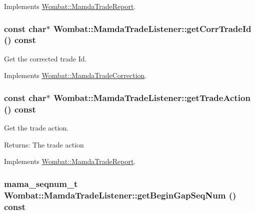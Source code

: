 Implements \hyperlink{classWombat_1_1MamdaTradeReport_8bccbbb68ce93d26fd87db95f2f7ff26}{Wombat::Mamda\-Trade\-Report}.\hypertarget{classWombat_1_1MamdaTradeListener_307d09719f4d878bdaeb211a6aa38465}{
\subsubsection[getCorrTradeId]{\setlength{\rightskip}{0pt plus 5cm}const char$\ast$ Wombat::Mamda\-Trade\-Listener::get\-Corr\-Trade\-Id () const}}
\label{classWombat_1_1MamdaTradeListener_307d09719f4d878bdaeb211a6aa38465}


Get the corrected trade Id. 



Implements \hyperlink{classWombat_1_1MamdaTradeCorrection_9e1763eab254bbe87ff3a577bb7c5ab3}{Wombat::Mamda\-Trade\-Correction}.\hypertarget{classWombat_1_1MamdaTradeListener_9201b4749efd0f17dc42abf5c2bc2060}{
\subsubsection[getTradeAction]{\setlength{\rightskip}{0pt plus 5cm}const char$\ast$ Wombat::Mamda\-Trade\-Listener::get\-Trade\-Action () const}}
\label{classWombat_1_1MamdaTradeListener_9201b4749efd0f17dc42abf5c2bc2060}


Get the trade action. 

\begin{Desc}
\item[Returns:]The trade action \end{Desc}


Implements \hyperlink{classWombat_1_1MamdaTradeReport_488ca9ba3b64fd6c0996e0df649c5834}{Wombat::Mamda\-Trade\-Report}.\hypertarget{classWombat_1_1MamdaTradeListener_62f2fd151a022948527e1f6ed74ced3d}{
\subsubsection[getBeginGapSeqNum]{\setlength{\rightskip}{0pt plus 5cm}mama\_\-seqnum\_\-t Wombat::Mamda\-Trade\-Listener::get\-Begin\-Gap\-Seq\-Num () const}}
\label{classWombat_1_1MamdaTradeListener_62f2fd151a022948527e1f6ed74ced3d}


